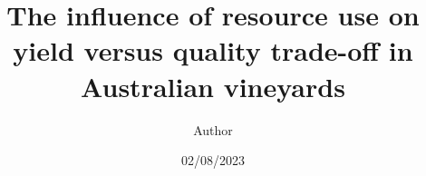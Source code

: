 \documentclass[review,12pt,authoryear]{elsarticle}
\begin{document}
\begin{linenumbers}
\begin{frontmatter}
\title{The influence of resource use on yield versus quality trade-off in Australian vineyards}
\author[label1,label2,label3]{Author}
\date{02/08/2023}
\begin{abstract}

\end{abstract}
\end{frontmatter}
\end{linenumbers}
\end{document}
